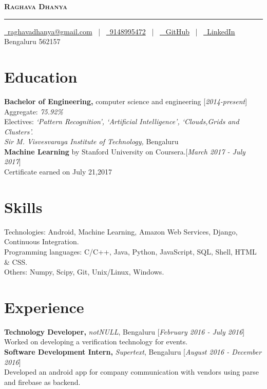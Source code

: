 \documentclass[11pt]{article}
\begin{document}
\thispagestyle{empty}

\begin{center}
	\textbf{\textsc{\Huge Raghava Dhanya}}
	\rule{\textwidth}{.4pt}
\end{center}

\begin{center}
	\href{mailto:raghavadhanya@gmail.com}{\faEnvelope\ raghavadhanya@gmail.com}
	\ | \
	\href{tel:9148995472}{\faPhoneSquare\ 9148995472}
	\ | \
	\href{https://github.com/RaghavaDhanya}{ \underline{\faGithubSquare\ GitHub}}
	\ | \ 
	\href{https://in.linkedin.com/in/raghavadhanya}{\underline{\faLinkedinSquare\ LinkedIn}}
	\\
	Bengaluru 562157
\end{center}

\section{Education}
\textbf{Bachelor of Engineering,} computer science and engineering \hfill [\textit{2014-present}]\\
Aggregate: \textit{75.92\%}\\
Electives: \textit{`Pattern Recognition', `Artificial Intelligence', `Clouds,Grids and Clusters'.}\\
\textit{Sir M. Visvesvaraya Institute of Technology,} Bengaluru
\medskip\\
\textbf{Machine Learning} by Stanford University on Coursera.\hfill [\textit{March 2017 - July 2017}]\\
Certificate earned on July 21,2017 

\section{Skills}
Technologies: Android, Machine Learning, Amazon Web Services, Django, Continuous Integration.\\
Programming languages: C/C++, Java, Python, JavaScript, SQL, Shell, HTML \& CSS.\\
Others: Numpy, Scipy, Git, Unix/Linux, Windows.

\section{Experience}
\textbf{Technology Developer,} \textit{notNULL}, Bengaluru \hfill [\textit{February 2016 - July 2016}]\\
Worked on developing a verification technology for events.\medskip\\
\textbf{Software Development Intern,} \textit{Supertext}, Bengaluru \hfill [\textit{August 2016 - December 2016}]\\
Developed an android app for company communication with vendors using parse and firebase as backend. 
\end{document}
